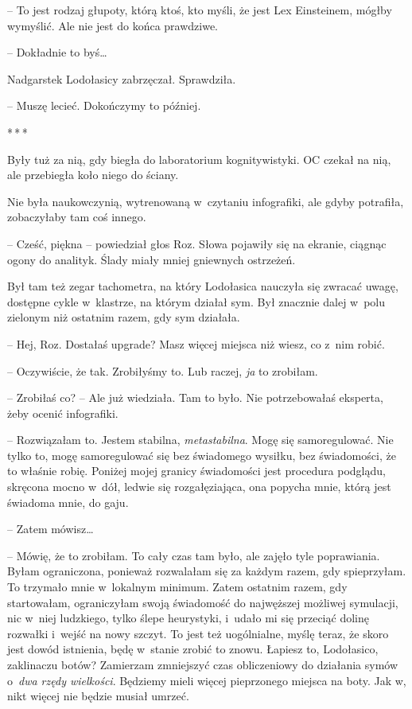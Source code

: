 \documentclass[oneside,polish,11pt,sfheadings]{mwbk}
\newcommand{\threeast}{\bigskip\par\centerline{*\,*\,*}\medskip\par}
\begin{document}
-- To jest rodzaj głupoty, którą ktoś, kto myśli, że jest Lex Einsteinem,
mógłby wymyślić. Ale nie jest do końca prawdziwe.

-- Dokładnie to byś\ldots 

Nadgarstek Lodołasicy zabrzęczał. Sprawdziła. 

-- Muszę lecieć. Dokończymy
to później.

\threeast

Były tuż za nią, gdy biegła do laboratorium kognitywistyki. OC czekał na
nią, ale przebiegła koło niego do ściany.

Nie była naukowczynią, wytrenowaną w~czytaniu infografiki, ale gdyby
potrafiła, zobaczyłaby tam coś innego.

-- Cześć, piękna -- powiedział głos Roz. Słowa pojawiły się na ekranie,
ciągnąc ogony do analityk. Ślady miały mniej gniewnych ostrzeżeń.

Był tam też zegar tachometra, na który Lodołasica nauczyła się zwracać
uwagę, dostępne cykle w~klastrze, na którym działał sym. Był znacznie
dalej w~polu zielonym niż ostatnim razem, gdy sym działała.

-- Hej, Roz. Dostałaś upgrade? Masz więcej miejsca niż wiesz, co z~nim
robić.

-- Oczywiście, że tak. Zrobiłyśmy to. Lub raczej, \textit{ja} to zrobiłam.

-- Zrobiłaś co? -- Ale już wiedziała. Tam to było. Nie potrzebowałaś
eksperta, żeby ocenić infografiki.

-- Rozwiązałam to. Jestem stabilna, \textit{metastabilna}. Mogę się
samoregulować. Nie tylko to, mogę samoregulować się bez świadomego
wysiłku, bez świadomości, że to właśnie robię. Poniżej mojej granicy
świadomości jest procedura podglądu, skręcona mocno w~dół, ledwie się
rozgałęziająca, ona popycha mnie, którą jest świadoma mnie, do gaju.

-- Zatem mówisz\ldots 

-- Mówię, że to zrobiłam. To cały czas tam było, ale zajęło tyle
poprawiania. Byłam ograniczona, ponieważ rozwalałam się za każdym razem,
gdy spieprzyłam. To trzymało mnie w~lokalnym minimum. Zatem ostatnim
razem, gdy startowałam, ograniczyłam swoją świadomość do najwęższej
możliwej symulacji, nic w~niej ludzkiego, tylko ślepe heurystyki, i~udało mi się przeciąć dolinę rozwałki i~wejść na nowy szczyt. To jest
też uogólnialne, myślę teraz, że skoro jest dowód istnienia, będę w~stanie zrobić to znowu. Łapiesz to, Lodołasico, zaklinaczu botów?
Zamierzam zmniejszyć czas obliczeniowy do działania symów o~\textit{dwa
rzędy wielkości}. Będziemy mieli więcej pieprzonego miejsca na boty. Jak
w, nikt więcej nie będzie musiał umrzeć.
\end{document}
